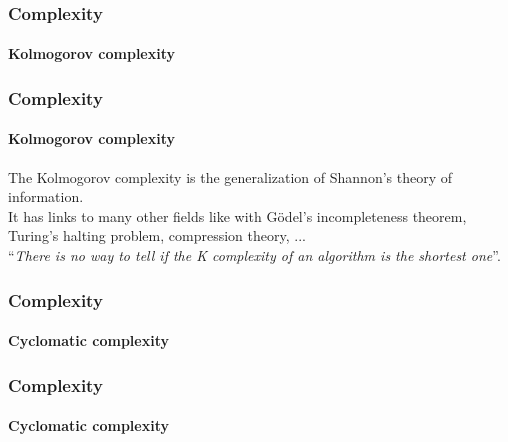 \begin{frame}
    \frametitle{Complexity}
    \framesubtitle{Kolmogorov complexity}

    
\end{frame}

\begin{frame}
    \frametitle{Complexity}
    \framesubtitle{Kolmogorov complexity}

    The Kolmogorov complexity is the generalization of Shannon's theory of
    information.
    \\
    It has links to many other fields like with Gödel's incompleteness
    theorem, Turing's halting problem, compression theory, ...
    \\
    \bigskip
     \pause
    ``\textit{There is no way to tell if the K complexity of an algorithm is the
    shortest one}''.
\end{frame}

\begin{frame}
    \frametitle{Complexity}
    \framesubtitle{Cyclomatic complexity}

    
\end{frame}

\begin{frame}[fragile,c]
    \frametitle{Complexity}
    \framesubtitle{Cyclomatic complexity}

\end{frame}

